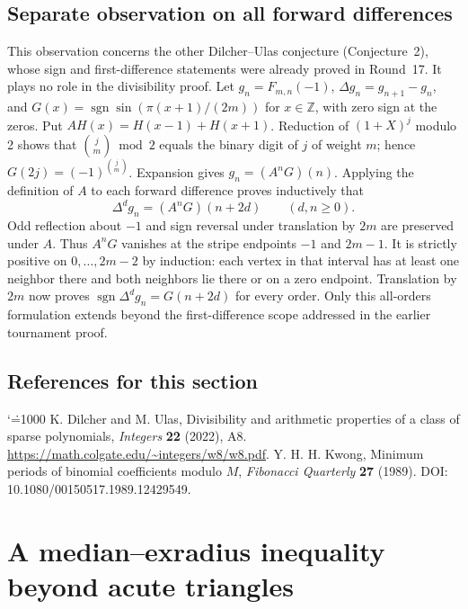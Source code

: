\documentclass[11pt,a4paper]{article}
\makeatletter
\numberwithin{equation}{section}
\theoremstyle{definition}
\theoremstyle{remark}
\renewenvironment{thebibliography}[1]
 {\subsection*{References for this section}\small
  \list{\@biblabel{\@arabic\c@enumiv}}
       {\settowidth\labelwidth{\@biblabel{#1}}\leftmargin\labelwidth
        \advance\leftmargin\labelsep\@openbib@code
        \usecounter{enumiv}\let\p@enumiv\@empty
        \renewcommand\theenumiv{\@arabic\c@enumiv}}
  \sloppy\clubpenalty4000\widowpenalty4000\sfcode`\.=1000\relax}
 {\def\@noitemerr{\@latex@warning{Empty bibliography}}\endlist}
\makeatother
\begin{document}
\subsection*{Separate observation on all forward differences}
This observation concerns the other Dilcher--Ulas conjecture (Conjecture~2),
whose sign and first-difference statements were already proved in Round~17.
It plays no role in the divisibility proof. Let
\(g_n=F_{m,n}(-1)\), \(\Delta g_n=g_{n+1}-g_n\), and
\(G(x)=\operatorname{sgn}\sin(\pi(x+1)/(2m))\) for \(x\in\mathbb Z\),
with zero sign at the zeros. Put \(A H(x)=H(x-1)+H(x+1)\).
Reduction of \((1+X)^j\) modulo 2 shows that
\(\binom jm\bmod2\) equals the binary digit of \(j\) of weight \(m\);
hence \(G(2j)=(-1)^{\binom jm}\).
Expansion gives \(g_n=(A^nG)(n)\). Applying the definition of \(A\)
to each forward difference proves inductively that
\[
 \Delta^d g_n=(A^nG)(n+2d)\qquad(d,n\ge0).
\]
Odd reflection about \(-1\) and sign reversal under translation by \(2m\)
are preserved under \(A\). Thus \(A^nG\) vanishes at the stripe endpoints
\(-1\) and \(2m-1\). It is strictly positive on \(0,\ldots,2m-2\) by
induction: each vertex in that interval has at least one neighbor there
and both neighbors lie there or on a zero endpoint. Translation by \(2m\)
now proves \(\operatorname{sgn}\Delta^d g_n=G(n+2d)\) for every order.
Only this all-orders formulation extends beyond the first-difference
scope addressed in the earlier tournament proof.
\begin{thebibliography}{9}
 K. Dilcher and M. Ulas,
Divisibility and arithmetic properties of a class of sparse polynomials,
\emph{Integers} \textbf{22} (2022), A8.
\url{https://math.colgate.edu/~integers/w8/w8.pdf}.
 Y. H. H. Kwong, Minimum periods of binomial coefficients
modulo \(M\), \emph{Fibonacci Quarterly} \textbf{27} (1989).
DOI: 10.1080/00150517.1989.12429549.
\end{thebibliography}

\par\endgroup

\begingroup
\newcommand{\cyc}{\sum_{\rm cyc}}
\section{\texorpdfstring{A median--exradius inequality beyond acute triangles}{A median--exradius inequality beyond acute triangles}}\label{section:r35keio}
\par\medskip
\end{document}
